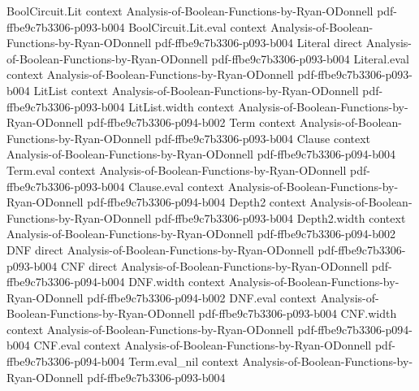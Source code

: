 \begin{lemma}
\label{RestrictionFourier.isPmOne_boolToSign}
\leanok
{}
\proofstep
  {BoolCircuit.Lit}
  {context}
  {Analysis-of-Boolean-Functions-by-Ryan-ODonnell}
  {pdf-ffbe9c7b3306-p093-b004}
\proofstep
  {BoolCircuit.Lit.eval}
  {context}
  {Analysis-of-Boolean-Functions-by-Ryan-ODonnell}
  {pdf-ffbe9c7b3306-p093-b004}
\proofstep
  {Literal}
  {direct}
  {Analysis-of-Boolean-Functions-by-Ryan-ODonnell}
  {pdf-ffbe9c7b3306-p093-b004}
\proofstep
  {Literal.eval}
  {context}
  {Analysis-of-Boolean-Functions-by-Ryan-ODonnell}
  {pdf-ffbe9c7b3306-p093-b004}
\proofstep
  {LitList}
  {context}
  {Analysis-of-Boolean-Functions-by-Ryan-ODonnell}
  {pdf-ffbe9c7b3306-p093-b004}
\proofstep
  {LitList.width}
  {context}
  {Analysis-of-Boolean-Functions-by-Ryan-ODonnell}
  {pdf-ffbe9c7b3306-p094-b002}
\proofstep
  {Term}
  {context}
  {Analysis-of-Boolean-Functions-by-Ryan-ODonnell}
  {pdf-ffbe9c7b3306-p093-b004}
\proofstep
  {Clause}
  {context}
  {Analysis-of-Boolean-Functions-by-Ryan-ODonnell}
  {pdf-ffbe9c7b3306-p094-b004}
\proofstep
  {Term.eval}
  {context}
  {Analysis-of-Boolean-Functions-by-Ryan-ODonnell}
  {pdf-ffbe9c7b3306-p093-b004}
\proofstep
  {Clause.eval}
  {context}
  {Analysis-of-Boolean-Functions-by-Ryan-ODonnell}
  {pdf-ffbe9c7b3306-p094-b004}
\proofstep
  {Depth2}
  {context}
  {Analysis-of-Boolean-Functions-by-Ryan-ODonnell}
  {pdf-ffbe9c7b3306-p093-b004}
\proofstep
  {Depth2.width}
  {context}
  {Analysis-of-Boolean-Functions-by-Ryan-ODonnell}
  {pdf-ffbe9c7b3306-p094-b002}
\proofstep
  {DNF}
  {direct}
  {Analysis-of-Boolean-Functions-by-Ryan-ODonnell}
  {pdf-ffbe9c7b3306-p093-b004}
\proofstep
  {CNF}
  {direct}
  {Analysis-of-Boolean-Functions-by-Ryan-ODonnell}
  {pdf-ffbe9c7b3306-p094-b004}
\proofstep
  {DNF.width}
  {context}
  {Analysis-of-Boolean-Functions-by-Ryan-ODonnell}
  {pdf-ffbe9c7b3306-p094-b002}
\proofstep
  {DNF.eval}
  {context}
  {Analysis-of-Boolean-Functions-by-Ryan-ODonnell}
  {pdf-ffbe9c7b3306-p093-b004}
\proofstep
  {CNF.width}
  {context}
  {Analysis-of-Boolean-Functions-by-Ryan-ODonnell}
  {pdf-ffbe9c7b3306-p094-b004}
\proofstep
  {CNF.eval}
  {context}
  {Analysis-of-Boolean-Functions-by-Ryan-ODonnell}
  {pdf-ffbe9c7b3306-p094-b004}
\proofstep
  {Term.eval_nil}
  {context}
  {Analysis-of-Boolean-Functions-by-Ryan-ODonnell}
  {pdf-ffbe9c7b3306-p093-b004}

\end{lemma}
